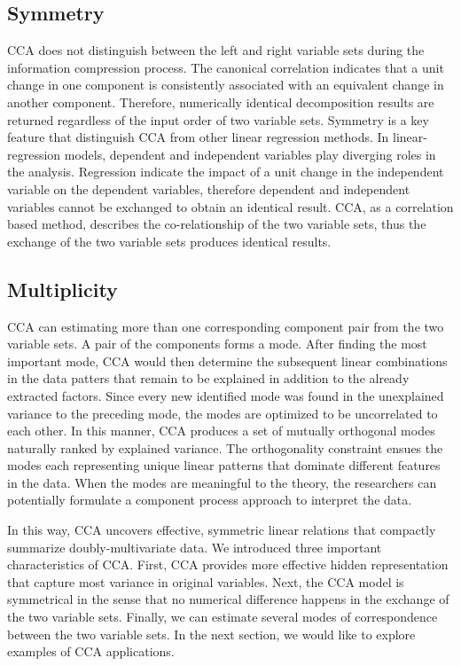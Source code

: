 \subsection{Symmetry}
CCA does not distinguish between the left and right variable sets during the information compression process. The canonical correlation indicates that a unit change in one component is consistently associated with an equivalent change in another component. Therefore, numerically identical decomposition results are returned regardless of the input order of two variable sets. Symmetry is a key feature that distinguish CCA from other linear regression methods. In linear-regression models, dependent and independent variables play diverging roles in the analysis. Regression indicate the impact of a unit change in the independent variable on the dependent variables, therefore dependent and independent variables cannot be exchanged to obtain an identical result. CCA, as a correlation based method, describes the co-relationship of the two variable sets, thus the exchange of the two variable sets produces identical results.

\subsection{Multiplicity}
CCA can estimating more than one corresponding component pair from the two variable sets. A pair of the components forms a mode. After finding the most important mode, CCA would then determine the subsequent linear combinations in the data patters that remain to be explained in addition to the already extracted factors. Since every new identified mode was found in the unexplained variance to the preceding mode, the modes are optimized to be uncorrelated to each other. In this manner, CCA produces a set of mutually orthogonal modes naturally ranked by explained variance. The orthogonality constraint ensues the modes each representing unique linear patterns that dominate different features in the data. When the modes are meaningful to the theory, the researchers can potentially formulate a component process approach to interpret the data.

In this way, CCA uncovers effective, symmetric linear relations that compactly summarize doubly-multivariate data. We introduced three important characteristics of CCA. First, CCA provides more effective hidden representation that capture most variance in original variables. Next, the CCA model is symmetrical in the sense that no numerical difference happens in the exchange of the two variable sets. Finally, we can estimate several modes of correspondence between the two variable sets. In the next section, we would like to explore examples of CCA applications.


